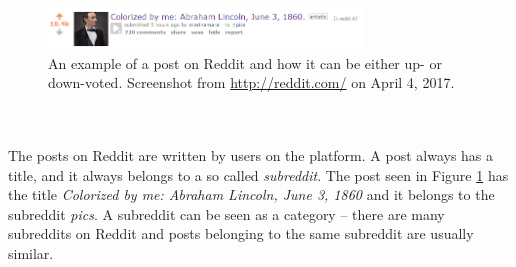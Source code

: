 \begin{figure}[h]
    \centering
    \includegraphics[width=0.75\textwidth]{figure/reddit/reddit_voting}
    \caption{An example of a post on Reddit and how it can be either up- or down-voted. Screenshot from \url{http://reddit.com/} on April 4, 2017.}
    \label{fig:example_reddit_post}
\end{figure}
\\\\
The posts on Reddit are written by users on the platform. A post always has a title, and it always belongs to a so called \textit{subreddit}. The post seen in Figure \ref{fig:example_reddit_post} has the title \textit{Colorized by me: Abraham Lincoln, June 3, 1860} and it belongs to the subreddit \textit{pics}. A subreddit can be seen as a category -- there are many subreddits on Reddit and posts belonging to the same subreddit are usually similar.